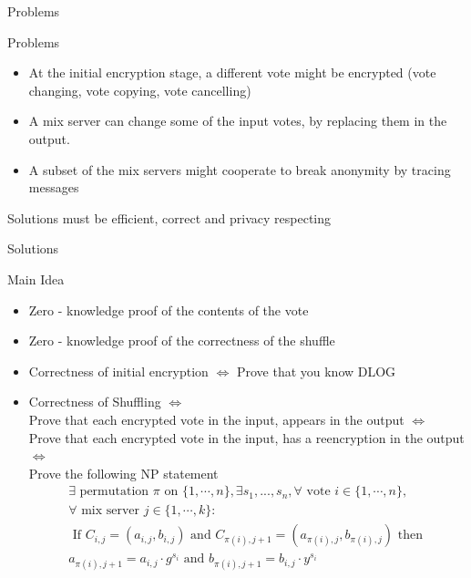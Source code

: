 \documentclass{beamer}
\begin{document}
\begin{frame}{Problems}
\begin{block}{Problems}
\begin{itemize}
\item At the initial encryption stage, a different vote might be encrypted (vote changing, vote copying, vote cancelling)
\item A mix server can change some of the input votes, by replacing them in the output.
\item A subset of the mix servers might cooperate to break anonymity by tracing messages
\end{itemize}
\end{block}

\begin{center}
\begin{large}
Solutions must be efficient, correct and privacy respecting
\end{large}
\end{center}

\end{frame} 

\begin{frame}{Solutions}
\begin{block}{Main Idea}
\begin{itemize}
\item Zero - knowledge proof of the contents of the vote
\item Zero - knowledge proof of the correctness of the shuffle
\end{itemize}
\end{block}

\begin{itemize}
\item Correctness of initial encryption $ \Leftrightarrow $ Prove that you know DLOG
\small
\item Correctness of Shuffling   $ \Leftrightarrow $ \\
	Prove that each encrypted vote in the input, appears in the output $ \Leftrightarrow $\\
	Prove that each encrypted vote in the input, has a reencryption in the output $ \Leftrightarrow $\\
	Prove the following NP statement 
\normalsize
\begin{align*}
\exists  \text{ permutation } \pi  \text { on }   \{1,\cdots, n \}, \exists  s_1,...,s_n, \forall  \text{ vote }  i \in \{1,\cdots, n \},  \\ \forall   \text{ mix server }  j \in \{1, \cdots, k \}  :\\ 
\text{ If }  C_{i,j} = (a_{i,j},b_{i,j})  \text{ and }  C_{\pi(i),j+1} = (a_{\pi(i),j},b_{\pi(i),j})  \text{ then } \\
a_{\pi(i),j+1} = a_{i,j} \cdot g^{s_i} \text{ and }
b_{\pi(i),j+1} = b_{i,j} \cdot y^{s_i}
\end{align*}
\end{itemize}
\end{frame}
\end{document}
